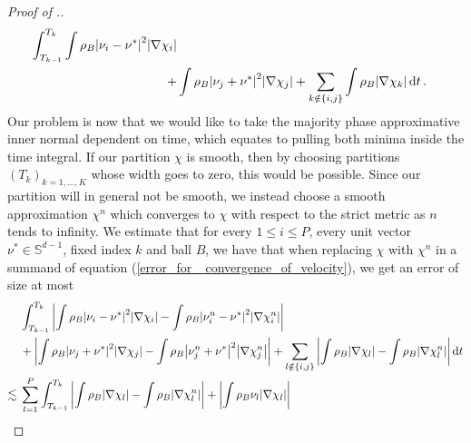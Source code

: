 \begin{proof}[Proof of .]
\begin{align}
						\int_{ T_{ k - 1 } }^{ T_{ k } }
							\int
								\rho_{ B } 
								\abs{ \nu_{ i } - \nu^{ \ast } }^{ 2 }
							\abs{ \nabla \chi_{ i } }
							\\
							\notag
							+ &
							\int
								\rho_{ B }
								\abs{ \nu_{ j } + \nu^{ \ast } }^{ 2 }
							\abs{ \nabla \chi_{ j } }
							+ 
							\sum_{ k \notin \{ i , j \} }
								\int
									\rho_{ B }
								\abs{ \nabla \chi_{ k } }
						\dd{ t }.
	\end{align}
	Our problem is now that we would like to take the majority phase 
	approximative inner normal dependent on time, which equates to pulling both 
	minima inside the time integral. If our partition $ \chi $ is smooth, then 
	by choosing partitions $ ( T_{ k } )_{ k = 1 , \dotsc, K } $ whose width 
	goes to zero, this would be possible. Since our partition will in general 
	not be smooth, we instead choose a smooth approximation $ \chi^{ n } $ 
	which converges to $ \chi $ with respect to the strict metric as $ n $ 
	tends to infinity. We estimate 
	that for every $ 1 \leq i \leq P $, every unit vector $ \nu^{ \ast } \in 
	\mathbb{ S }^{ d - 1 } $, fixed index $ k $ and ball $ B $, we have that 
	when replacing $ \chi $ with $ \chi^{ n } $ in  a summand of equation 
	(\ref{error_for 
	_convergence_of_velocity}), we get an error of size at most
	\begin{align*}
		 & \int_{ T_{ k - 1 } }^{ T_{ k } }
		 	\abs{ 
		 		\int
		 			\rho_{ B }
		 			\abs{
		 				\nu_{ i } - \nu^{ \ast }
		 			}^{ 2 }
	 			\abs{ \nabla \chi_{ i } }
	 			-
	 			\int
	 				\rho_{ B }
	 				\abs{ \nu_{ i }^{ n } - \nu^{ \ast } }^{ 2 }
	 			\abs{ \nabla \chi_{ i }^{ n } }
	 		}
 			\\
 			& +
 			\abs{
 				\int
 					\rho_{ B } 
 					\abs{ \nu_{ j } + \nu^{ \ast } }^{ 2 }
 				\abs{ \nabla \chi_{ j } }
 				-
 				\int
 					\rho_{ B }
 					\abs{ \nu_{ j }^{ n } + \nu^{ \ast } }^{ 2 }
 				\abs{ \nabla \chi_{ j }^{ n } }
 			}
 			+
 			\sum_{ l \notin \{ i , j \} }
 				\abs{
 					\int
 						\rho_{ B }
 					\abs{ \nabla \chi_{ l } }
 					-
 					\int
 						\rho_{ B }
 					\abs{ \nabla \chi_{ l }^{ n } }
 				}
 		\dd{ t }
 		\\
 		\lesssim{} &
 		\sum_{ l = 1 }^{ P }
 			\int_{ T_{ k - 1 } }^{ T_{ k } }
 				\abs{ 
 					\int
 						\rho_{ B }
 					\abs{ \nabla \chi_{ l } }
 					-
 					\int
 						\rho_{ B }
 					\abs{ \nabla \chi_{ l }^{ n } }
 				}
 				+
 				\abs{ 
 					\int
 						\rho_{ B }
 						\nu_{ l }
 					\abs{ \nabla \chi_{ l } }
}
\end{align*}
\end{proof}
